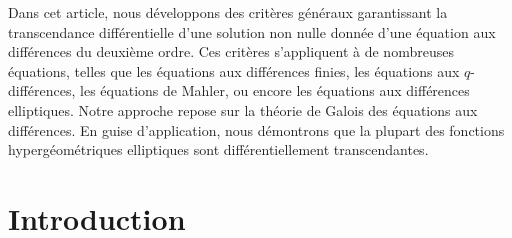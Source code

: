 \documentclass[JEP,XML,SOM,Unicode]{cedram}
\theoremstyle{definition}
\begin{document}


\begin{altabstract}
Dans cet article, nous développons des critères généraux garantissant la transcendance différentielle d'une solution non nulle donnée d’une équation aux différences du deuxième ordre. Ces critères s’appliquent à de nombreuses équations, telles que les équations aux différences finies, les équations aux $q$-différences, les équations de Mahler, ou encore les équations aux différences elliptiques.  Notre approche repose sur la théorie de Galois des équations aux différences.  En guise d'application, nous démontrons que la plupart des fonctions hypergéométriques elliptiques sont différentiellement transcendantes.
\end{altabstract}


\maketitle
\tableofcontents
\mainmatter

\section{Introduction}
\end{document}
